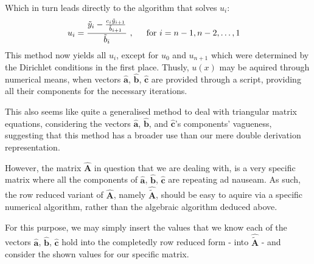 \documentclass[11pt,a4paper,notitlepage]{article}
\begin{document}
Which in turn leads directly to the algorithm that solves $u_i$:
\begin{align*}
u_{i} &= \frac{\tilde{y}_{i} - \frac{c_{i}\tilde{y}_{i+1}}{\tilde{b}_{i+1}}}{ \tilde{b}_{i}}\ , \indent \text{for $i = n-1, n-2, \dots , 1$}
\end{align*}
This method now yields all $u_i$, except for $u_0$ and $u_{n+1}$ which were determined by the Dirichlet conditions in the first place. Thusly, $u(x)$ may be aquired through numerical means, when vectors $\mathbf{\hat{a}}$, $\mathbf{\hat{b}}$, $\mathbf{\hat{c}}$ are provided through a script, providing all their components for the necessary iterations.

This also seems like quite a generalised method to deal with triangular matrix equations, considering the vectors $\mathbf{\hat{a}}$, $\mathbf{\hat{b}}$, and $\mathbf{\hat{c}}$'s components' vagueness, suggesting that this method has a broader use than our mere double derivation representation.

However, the matrix \hyperref[mat:1]{$\mathbf{\hat{A}}$} in question that we are dealing with, is a very specific matrix where all the components of $\mathbf{\hat{a}}$, $\mathbf{\hat{b}}$, $\mathbf{\hat{c}}$ are repeating ad nauseam. As such, the row reduced variant of $\mathbf{\hat{A}}$, namely $\mathbf{\hat{\tilde{A}}}$, should be easy to aquire via a specific numerical algorithm, rather than the algebraic algorithm deduced above.

For this purpose, we may simply insert the values that we know each of the vectors $\mathbf{\hat{a}}$, $\mathbf{\hat{b}}$, $\mathbf{\hat{c}}$ hold into the completedly row reduced form - into $\mathbf{\hat{\tilde{A}}}$ - and consider the shown values for our specific matrix.
\end{document}
